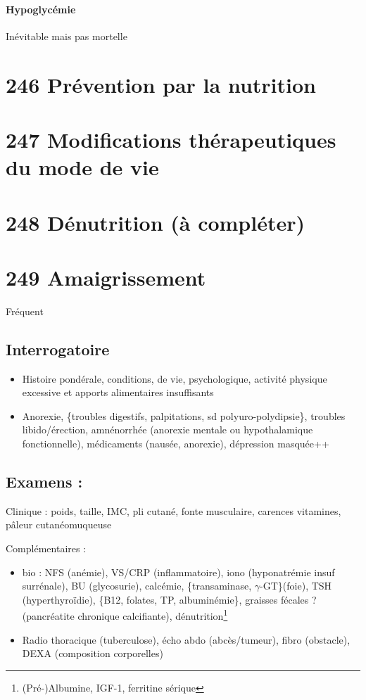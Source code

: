 \documentclass{book}
\begin{document}
\paragraph{Hypoglycémie}
\label{sec:orge4e1f8f}
Inévitable  mais pas mortelle
\section{246 \textdagger{} Prévention par la nutrition}
\label{sec:org007f013}
\section{247 \textdagger{} Modifications thérapeutiques du mode de vie}
\label{sec:org9123970}
\section{248 \textdagger{} Dénutrition (à compléter)}
\label{sec:orgcf258a5}
\section{249 \textdagger{} Amaigrissement}
\label{sec:orgcc7cd99}
Fréquent

\subsection{Interrogatoire}
\label{sec:org824b41c}
\begin{itemize}
\item Histoire pondérale, conditions, de vie, psychologique, activité physique excessive et apports alimentaires insuffisants
\item Anorexie, \{troubles digestifs, palpitations, sd polyuro-polydipsie\}, troubles
libido/érection, amnénorrhée (anorexie mentale ou hypothalamique
fonctionnelle), médicaments (nausée, anorexie), dépression masquée++
\end{itemize}

\subsection{Examens :}
\label{sec:org71e165e}
Clinique : poids, taille, IMC, pli cutané, fonte musculaire, carences vitamines,
pâleur cutanéomuqueuse

Complémentaires :
\begin{itemize}
\item bio : NFS (anémie), VS/CRP (inflammatoire), iono (hyponatrémie \thus insuf
surrénale), BU (glycosurie), calcémie, \{transaminase, \(\gamma\)-GT\}(foie), TSH
(hyperthyroïdie), \{B12, folates, TP, albuminémie\}, graisses fécales ?
(pancréatite chronique calcifiante), dénutrition\footnote{(Pré-)Albumine, IGF-1, ferritine sérique}
\item Radio thoracique (tuberculose), écho abdo (abcès/tumeur), fibro (obstacle),
DEXA (composition corporelles)
\end{itemize}
\end{document}
